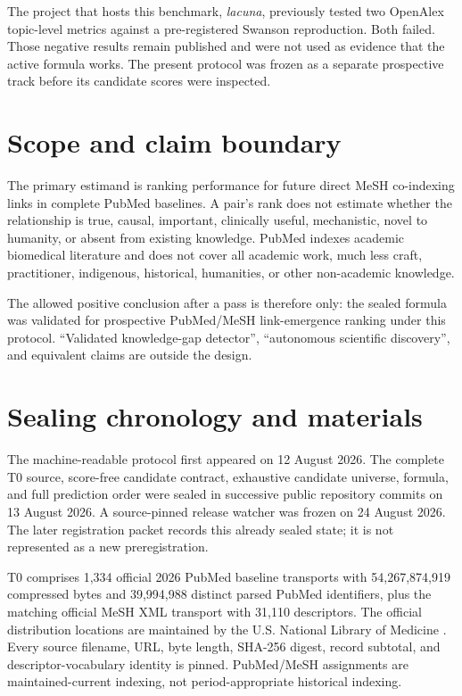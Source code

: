 \documentclass[11pt]{article}
\begin{document}
The project that hosts this benchmark, \emph{lacuna}, previously tested two OpenAlex topic-level
metrics against a pre-registered Swanson reproduction. Both failed. Those negative results remain
published and were not used as evidence that the active formula works. The present protocol was
frozen as a separate prospective track before its candidate scores were inspected.

\section{Scope and claim boundary}

The primary estimand is ranking performance for future direct MeSH co-indexing links in complete
PubMed baselines. A pair's rank does not estimate whether the relationship is true, causal,
important, clinically useful, mechanistic, novel to humanity, or absent from existing knowledge.
PubMed indexes academic biomedical literature and does not cover all academic work, much less
craft, practitioner, indigenous, historical, humanities, or other non-academic knowledge.

The allowed positive conclusion after a pass is therefore only: the sealed formula was validated
for prospective PubMed/MeSH link-emergence ranking under this protocol. ``Validated knowledge-gap
detector'', ``autonomous scientific discovery'', and equivalent claims are outside the design.

\section{Sealing chronology and materials}

The machine-readable protocol first appeared on 12 August 2026. The complete T0 source, score-free
candidate contract, exhaustive candidate universe, formula, and full prediction order were sealed
in successive public repository commits on 13 August 2026. A source-pinned release watcher was
frozen on 24 August 2026. The later registration packet records this already sealed state; it is not
represented as a new preregistration.

T0 comprises 1,334 official 2026 PubMed baseline transports with 54,267,874,919 compressed bytes
and 39,994,988 distinct parsed PubMed identifiers, plus the matching official MeSH XML transport
with 31,110 descriptors. The official distribution locations are maintained by the U.S. National
Library of Medicine \cite{nlmpubmed,nlmmesh}. Every source filename, URL, byte length, SHA-256
digest, record subtotal, and descriptor-vocabulary identity is pinned. PubMed/MeSH assignments are
maintained-current indexing, not period-appropriate historical indexing.
\end{document}
